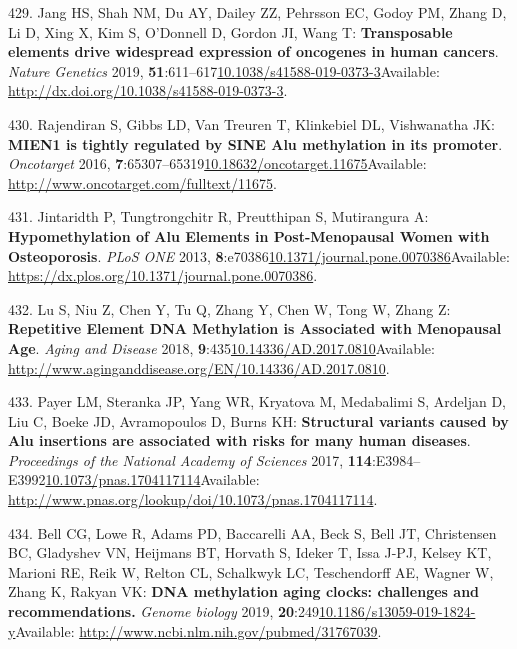 \documentclass[
]{book}
\begin{document}
\leavevmode\hypertarget{ref-Jang2019}{}%
429. Jang HS, Shah NM, Du AY, Dailey ZZ, Pehrsson EC, Godoy PM, Zhang D, Li D, Xing X, Kim S, O'Donnell D, Gordon JI, Wang T: \textbf{Transposable elements drive widespread expression of oncogenes in human cancers}. \emph{Nature Genetics} 2019, \textbf{51}:611--617\href{https://doi.org/10.1038/s41588-019-0373-3}{10.1038/s41588-019-0373-3}Available: \url{http://dx.doi.org/10.1038/s41588-019-0373-3}.

\leavevmode\hypertarget{ref-Rajendiran2016}{}%
430. Rajendiran S, Gibbs LD, Van Treuren T, Klinkebiel DL, Vishwanatha JK: \textbf{MIEN1 is tightly regulated by SINE Alu methylation in its promoter}. \emph{Oncotarget} 2016, \textbf{7}:65307--65319\href{https://doi.org/10.18632/oncotarget.11675}{10.18632/oncotarget.11675}Available: \url{http://www.oncotarget.com/fulltext/11675}.

\leavevmode\hypertarget{ref-Jintaridth2013}{}%
431. Jintaridth P, Tungtrongchitr R, Preutthipan S, Mutirangura A: \textbf{Hypomethylation of Alu Elements in Post-Menopausal Women with Osteoporosis}. \emph{PLoS ONE} 2013, \textbf{8}:e70386\href{https://doi.org/10.1371/journal.pone.0070386}{10.1371/journal.pone.0070386}Available: \url{https://dx.plos.org/10.1371/journal.pone.0070386}.

\leavevmode\hypertarget{ref-Lu2018a}{}%
432. Lu S, Niu Z, Chen Y, Tu Q, Zhang Y, Chen W, Tong W, Zhang Z: \textbf{Repetitive Element DNA Methylation is Associated with Menopausal Age}. \emph{Aging and Disease} 2018, \textbf{9}:435\href{https://doi.org/10.14336/AD.2017.0810}{10.14336/AD.2017.0810}Available: \url{http://www.aginganddisease.org/EN/10.14336/AD.2017.0810}.

\leavevmode\hypertarget{ref-Payer2017}{}%
433. Payer LM, Steranka JP, Yang WR, Kryatova M, Medabalimi S, Ardeljan D, Liu C, Boeke JD, Avramopoulos D, Burns KH: \textbf{Structural variants caused by Alu insertions are associated with risks for many human diseases}. \emph{Proceedings of the National Academy of Sciences} 2017, \textbf{114}:E3984--E3992\href{https://doi.org/10.1073/pnas.1704117114}{10.1073/pnas.1704117114}Available: \url{http://www.pnas.org/lookup/doi/10.1073/pnas.1704117114}.

\leavevmode\hypertarget{ref-Bell2019}{}%
434. Bell CG, Lowe R, Adams PD, Baccarelli AA, Beck S, Bell JT, Christensen BC, Gladyshev VN, Heijmans BT, Horvath S, Ideker T, Issa J-PJ, Kelsey KT, Marioni RE, Reik W, Relton CL, Schalkwyk LC, Teschendorff AE, Wagner W, Zhang K, Rakyan VK: \textbf{DNA methylation aging clocks: challenges and recommendations.} \emph{Genome biology} 2019, \textbf{20}:249\href{https://doi.org/10.1186/s13059-019-1824-y}{10.1186/s13059-019-1824-y}Available: \url{http://www.ncbi.nlm.nih.gov/pubmed/31767039}.
\end{document}
